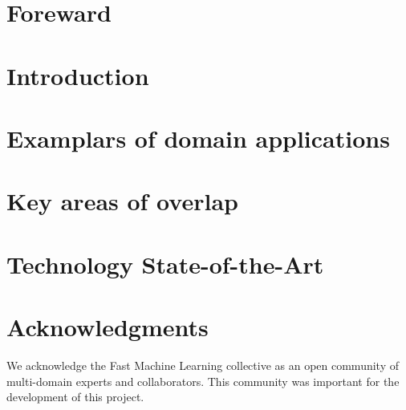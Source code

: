 \documentclass[utf8]{frontiersFPHY}
\begin{document}
\clearpage
\begin{spacing}{1.3}
\section*{Foreward}


\pagebreak
\section{Introduction}


\pagebreak
\section{Examplars of domain applications}
\label{sec:apps}



\pagebreak
\section{Key areas of overlap}
\label{sec:overlaps}


\pagebreak
\section{Technology State-of-the-Art}
\label{sec:technolog_sota}



\section*{Acknowledgments}
We acknowledge the Fast Machine Learning collective as an open community of multi-domain experts and collaborators. 
This community was important for the development of this project. 


\clearpage


\end{spacing}
\end{document}
